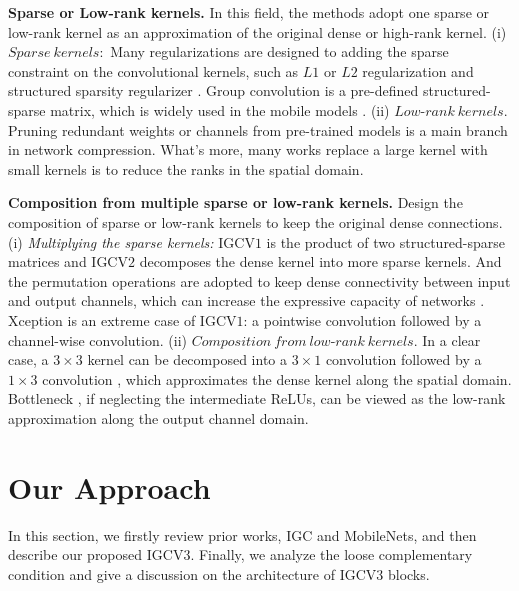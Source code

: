 \documentclass{bmvc2k}
\begin{document}
	\noindent\textbf{Sparse or Low-rank kernels.} In this field, the methods adopt one sparse or low-rank kernel as an approximation of the original dense or high-rank kernel.
	(i) $Sparse\ kernels:$ Many regularizations are designed to adding the sparse constraint on the convolutional kernels, such as $L1$ or $L2$ regularization \cite{HanMD15,HanPTD15} and structured sparsity regularizer \cite{LiKDSG16,WenWWCL16,alvarez2016learning}. Group convolution is a pre-defined structured-sparse matrix, which is widely used in the mobile models \cite{XieGDTH16,ZhaoWLTZ16}. (ii) $Low$-$rank\ kernels.$ Pruning redundant weights or channels from pre-trained models \cite{park2016faster,LiKDSG16,he2017channel,LuoWL17} is a main branch in network compression. What's more, many works \cite{SimonyanZ14a,SzegedyVISW16,denton2014exploiting} replace a large kernel with small kernels is to reduce the ranks in the spatial domain.

	\noindent\textbf{Composition from multiple sparse or low-rank kernels.} Design the composition of sparse or low-rank kernels to keep the original dense connections.
	(i) \emph{Multiplying the sparse kernels:} IGCV$1$ \cite{zhang2017interleaved} is the product of two structured-sparse matrices and IGCV$2$ \cite{ISSC18} decomposes the dense kernel into more sparse kernels. And the permutation operations \cite{zhang2017interleaved} are adopted to keep dense connectivity between input and output channels, which can increase the expressive capacity of networks \cite{sharir2017expressive}.
	Xception \cite{Chollet16a} is an extreme case of IGCV$1$: a pointwise convolution followed by a channel-wise convolution.
	(ii) $Composition\ from\ low$-$rank\ kernels.$ In a clear case, a $3\times3$ kernel can be decomposed into a $3\times1$ convolution followed by a $1\times3$ convolution \cite{IoannouRSCC15, JaderbergVZ14, MamaletG12}, which approximates the dense kernel along the spatial domain. Bottleneck \cite{he2016deep,iandola2016squeezenet,sandler2018inverted}, if neglecting the intermediate ReLUs, can be viewed as the low-rank approximation along the output channel domain.

	\section{Our Approach}
	In this section, we firstly review prior works, IGC and MobileNets, and then describe our proposed IGCV$3$. Finally, we analyze the loose complementary condition and give a discussion on the architecture of IGCV$3$ blocks.
\end{document}
